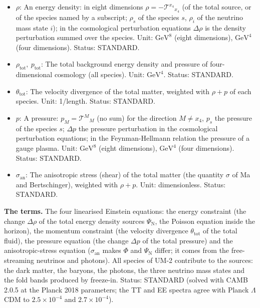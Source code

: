 \documentclass[
  10pt,
]{article}
\begin{document}
\begin{itemize}
  \(\Delta m^2_{21} = m_2^2 - m_1^2\) a difference of squared masses,
  \(\Delta N_{\mathrm{eff}}\) an addition to \(N_{\mathrm{eff}}\),
  \(\Delta S_{\mathrm{m}}\) the change of an action under a change
  \(\Delta g^{MN}\) of the metric. In an uncertainty relation it is the
  spread, the root-mean-square deviation from the mean value in a state:
  \(\Delta x_0\), \(\Delta k_{x_0}\), \(\Delta\xi\), \(\Delta(fy)\) (as
  in the author's \(\Delta x_0\,\Delta p_{x_0} \ge \hbar/2\)). Status:
  STANDARD.
\item
  \(\rho\): An energy density: in eight dimensions
  \(\rho = -\mathcal{T}^{x_4}{}_{x_4}\) (of the total source, or of the
  species named by a subscript; \(\rho_s\) of the species \(s\),
  \(\rho_i\) of the neutrino mass state \(i\)); in the cosmological
  perturbation equations \(\Delta\rho\) is the density perturbation
  summed over the species. Unit: \(\mathrm{GeV}^{8}\) (eight
  dimensions), \(\mathrm{GeV}^{4}\) (four dimensions). Status: STANDARD.
\item
  \(\rho_{\mathrm{tot}},\ p_{\mathrm{tot}}\): The total background
  energy density and pressure of four-dimensional cosmology (all
  species). Unit: \(\mathrm{GeV}^{4}\). Status: STANDARD.
\item
  \(\theta_{\mathrm{tot}}\): The velocity divergence of the total
  matter, weighted with \(\rho + p\) of each species. Unit: 1/length.
  Status: STANDARD.
\item
  \(p\): A pressure: \(p_M = \mathcal{T}^M{}_M\) (no sum) for the
  direction \(M \ne x_4\), \(p_s\) the pressure of the species \(s\);
  \(\Delta p\) the pressure perturbation in the cosmological
  perturbation equations; in the Feynman-Hellmann relation the pressure
  of a gauge plasma. Unit: \(\mathrm{GeV}^{8}\) (eight dimensions),
  \(\mathrm{GeV}^{4}\) (four dimensions). Status: STANDARD.
\item
  \(\sigma_{\mathrm{an}}\): The anisotropic stress (shear) of the total
  matter (the quantity \(\sigma\) of Ma and Bertschinger), weighted with
  \(\rho + p\). Unit: dimensionless. Status: STANDARD.
\end{itemize}

\textbf{The terms.} The four linearised Einstein equations: the energy
constraint (the change \(\Delta\rho\) of the total energy density
sources \(\Psi_{\mathrm{N}}\), the Poisson equation inside the horizon),
the momentum constraint (the velocity divergence
\(\theta_{\mathrm{tot}}\) of the total fluid), the pressure equation
(the change \(\Delta p\) of the total pressure) and the
anisotropic-stress equation (\(\sigma_{\mathrm{an}}\) makes \(\Phi\) and
\(\Psi_{\mathrm{N}}\) differ; it comes from the free-streaming neutrinos
and photons). All species of UM-2 contribute to the sources: the dark
matter, the baryons, the photons, the three neutrino mass states and the
fold bands produced by freeze-in. Status: STANDARD (solved with CAMB
2.0.5 at the Planck 2018 parameters; the TT and EE spectra agree with
Planck \(\Lambda\)CDM to \(2.5\times10^{-4}\) and \(2.7\times10^{-4}\)).
\end{document}
